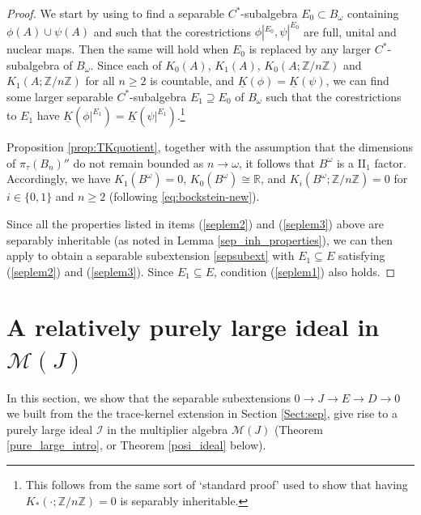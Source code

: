 \documentclass[reqno]{amsart}
\theoremstyle{definition}
\theoremstyle{remark}
\numberwithin{equation}{section}
\theoremstyle{definition}
\begin{document}
\begin{proof}
We start by using \cite[Proposition 1.9]{Schafhauser.Annals} to find a separable $C^*$-subalgebra $E_0\subset B_\omega$ containing $\phi(A)\cup \psi(A)$ and such that the corestrictions $\phi|^{E_0},\psi|^{E_0}$ are full, unital and nuclear maps. Then the same will hold when $E_0$ is replaced by any larger $C^*$-subalgebra of $B_\omega$. Since each of $K_0(A)$, $K_1(A)$, $K_0(A;\mathbb Z/n\mathbb Z)$ and $K_1(A;\mathbb Z/n\mathbb Z)$ for all $n\geq 2$ is countable, and $\underline{K}(\phi)=\underline{K}(\psi)$, we can find some larger separable $C^*$-subalgebra $E_1\supseteq E_0$ of $B_\omega$ such that the corestrictions to $E_1$ have $\underline{K}(\phi|^{E_1})=\underline{K}(\psi|^{E_1})$.\footnote{This follows from the same sort of `standard proof' used to show that having $K_*(\cdot;\mathbb Z/n\mathbb Z)=0$ is separably inheritable.} 

Proposition \ref{prop:TKquotient}, together with the assumption that the dimensions of $\pi_\tau(B_n)''$ do not remain bounded as $n\to\omega$, it follows that $B^\omega$ is a II$_1$ factor. Accordingly, we have $K_{1} (B^{\omega}) = 0$,  $K_{0} (B^{\omega}) \cong \mathbb{R}$, and $K_{i} (B^{\omega}; \mathbb{Z} / n\mathbb{Z}) = 0$ for $i\in \{0,1\}$ and $n\geq 2$ (following \eqref{eq:bockstein-new}). 

Since all the properties listed in items (\ref{seplem2}) and (\ref{seplem3}) above are separably inheritable (as noted in Lemma \ref{sep_inh_properties}), we can then apply  \cite[Proposition 1.6]{Schafhauser.Annals} to obtain a separable subextension \eqref{sepsubext} with $E_1\subseteq E$ satisfying (\ref{seplem2}) and (\ref{seplem3}). Since $E_1\subseteq E$, condition (\ref{seplem1}) also holds. 
\end{proof} 


\section{A relatively purely large ideal in $\mathcal M(J)$} 
\label{pure_large_sec} 
In this section, we show that the separable subextensions $0\rightarrow J\rightarrow E\rightarrow D\rightarrow 0$ we built from the the trace-kernel extension in Section \ref{Sect:sep}, give rise to a purely large ideal $\mathcal I$ in the multiplier algebra $\mathcal M(J)$ (Theorem \ref{pure_large_intro}, or Theorem \ref{posi_ideal} below). 
\end{document}
